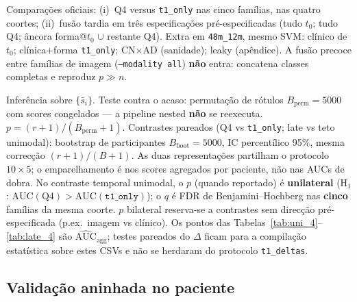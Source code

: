 \documentclass[review]{elsarticle}
\newcommand{\code}[1]{\texttt{#1}}
\begin{document}
Comparações oficiais: (i)~Q4 versus \code{t1\_only} nas cinco famílias, nas quatro coortes;
(ii)~fusão tardia em três especificações pré-especificadas (tudo $t_0$; tudo Q4; âncora forma@$t_0$ $\cup$ restante Q4).
Extra em \code{48m\_12m}, mesmo SVM: clínico de $t_0$; clínica$+$forma \code{t1\_only}; CN$\times$AD (sanidade); leaky (apêndice).
A fusão precoce entre famílias de imagem (\code{--modality all}) \textbf{não} entra: concatena classes completas e reproduz $p\gg n$.

Inferência sobre $\{\bar{s}_i\}$.
Teste contra o acaso: permutação de rótulos $B_{\mathrm{perm}}=5000$ com scores congelados --- a pipeline nested \textbf{não} se reexecuta.
$p=(r+1)/(B_{\mathrm{perm}}+1)$.
Contrastes pareados (Q4 vs \code{t1\_only}; late vs teto unimodal): bootstrap de participantes $B_{\mathrm{boot}}=5000$, IC percentílico 95\%, mesma correcção $(r+1)/(B+1)$.
As duas representações partilham o protocolo $10\times 5$; o emparelhamento é nos scores agregados por paciente, não nas AUCs de dobra.
No contraste temporal unimodal, o $p$ (quando reportado) é \textbf{unilateral} (H$_1$: $\mathrm{AUC}(\mathrm{Q4})>\mathrm{AUC}(\code{t1\_only})$); o $q$ é FDR de Benjamini--Hochberg nas \textbf{cinco} famílias da mesma coorte.
$p$ bilateral reserva-se a contrastes sem direcção pré-especificada (p.ex.\ imagem vs clínico).
Os pontos das Tabelas~\ref{tab:uni_4}--\ref{tab:late_4} são $\widehat{\mathrm{AUC}}_{\mathrm{agg}}$; testes pareados do $\Delta$ ficam para a compilação estatística sobre estes CSVs e não se herdaram do protocolo \code{t1\_deltas}.

\subsection{Validação aninhada no paciente}
\label{sec:modelagem}
\end{document}
